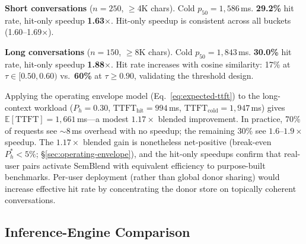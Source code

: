 \documentclass[10pt,twocolumn]{article}
\begin{document}
\noindent\textbf{Short conversations} ($n{=}250$, $\geq$4K chars).
Cold $p_{50}{=}1{,}586$\,ms.
\textbf{29.2\%} hit rate,
hit-only speedup \textbf{1.63$\times$}.
Hit-only speedup is consistent across all buckets
(1.60--1.69$\times$).

\noindent\textbf{Long conversations} ($n{=}150$, $\geq$8K chars).
Cold $p_{50}{=}1{,}843$\,ms.
\textbf{30.0\%} hit rate,
hit-only speedup \textbf{1.88$\times$}.
Hit rate increases with cosine similarity: 17\% at
$\tau{\in}[0.50,0.60)$ vs.\ \textbf{60\%} at $\tau{\geq}0.90$,
validating the threshold design.

Applying the operating envelope model (Eq.~\ref{eq:expected-ttft}) to
the long-context workload ($P_h{=}0.30$, $\text{TTFT}_\text{hit}{=}994$\,ms,
$\text{TTFT}_\text{cold}{=}1{,}947$\,ms) gives
$\mathbb{E}[\text{TTFT}]{=}1{,}661$\,ms---a modest $\mathbf{1.17\times}$
blended improvement. In practice, 70\% of requests see
${\sim}8$\,ms overhead with no speedup; the remaining 30\% see
$1.6$--$1.9\times$ speedup.
The $1.17\times$ blended gain is nonetheless net-positive
(break-even $P_h^*{<}5\%$; \S\ref{sec:operating-envelope}),
and the hit-only speedups confirm that real-user pairs activate
SemBlend with equivalent efficiency to purpose-built benchmarks.
Per-user deployment (rather than global donor sharing) would
increase effective hit rate by concentrating the donor store on
topically coherent conversations.

\subsection{Inference-Engine Comparison}
\label{sec:inference-comparison}
\end{document}
